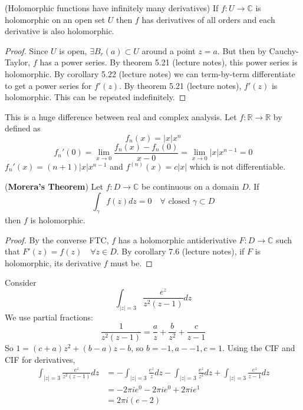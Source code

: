 \begin{corollary}
	(Holomorphic functions have infinitely many derivatives) If $f: U \rightarrow \mathbb{C}$ is holomorphic on an open set $U$ then $f$ has derivatives of all orders and each derivative is also holomorphic.
\end{corollary}

\begin{proof}
	Since $U$ is open, $\exists B_r(a) \subset U$ around a point $z = a$. But then by Cauchy-Taylor, $f$ has a power series. By theorem 5.21 (lecture notes), this power series is holomorphic. By corollary 5.22 (lecture notes) we can term-by-term differentiate to get a power series for $f'(z)$. By theorem 5.21 (lecture notes), $f'(z)$ is holomorphic. This can be repeated indefinitely.
\end{proof}

\begin{remark}
	This is a huge difference between real and complex analysis. Let $f: \mathbb{R} \rightarrow \mathbb{R}$ by defined as
	\[
		f_n(x) = |x| x^n
	\]
	\[
		f_n'(0) = \lim_{x \rightarrow 0} \frac{f_n(x) - f_n(0)}{x - 0} = \lim_{x \rightarrow 0} |x| x^{n - 1} = 0
	\]
	$f_n'(x) = (n + 1) |x| x^{n - 1}$ and $f^{(n)} (x) = c|x|$ which is not differentiable.
\end{remark}

\begin{theorem}
	(\textbf{Morera's Theorem}) Let $f: D \rightarrow \mathbb{C}$ be continuous on a domain $D$. If
	\[
		\int_{\gamma} f(z) dz = 0 \quad \forall \text{ closed } \gamma \subset D
	\]
	then $f$ is holomorphic.
\end{theorem}

\begin{proof}
	By the converse FTC, $f$ has a holomorphic antiderivative $F: D \rightarrow \mathbb{C}$ such that $F'(z) = f(z) \quad \forall z \in D$. By corollary 7.6 (lecture notes), if $F$ is holomorphic, its derivative $f$ must be.
\end{proof}

\begin{example}
	Consider
	\[
		\int_{|z| = 3} \frac{e^z}{z^2 (z - 1)} dz
	\]
	We use partial fractions:
	\[
		\frac{1}{z^2 (z - 1)} = \frac{a}{z} + \frac{b}{z^2} + \frac{c}{z - 1}
	\]
	So $1 = (c + a) z^2 + (b - a) z - b$, so $b = -1, a - -1, c = 1$. Using the CIF and CIF for derivatives,
	\[
		\begin{aligned}
			\int_{|z| = 3} \frac{e^z}{z^2 (z - 1)} dz
				& = -\int_{|z| = 3} \frac{e^z}{z} dz - \int_{|z| = 3} \frac{e^z}{z^2} dz + \int_{|z| = 3} \frac{e^z}{z - 1} dz \\
				& = -2 \pi i e^0 - 2 \pi i e^0 + 2 \pi i e^1 \\
				& = 2 \pi i (e - 2)
		\end{aligned}
	\]
\end{example}

